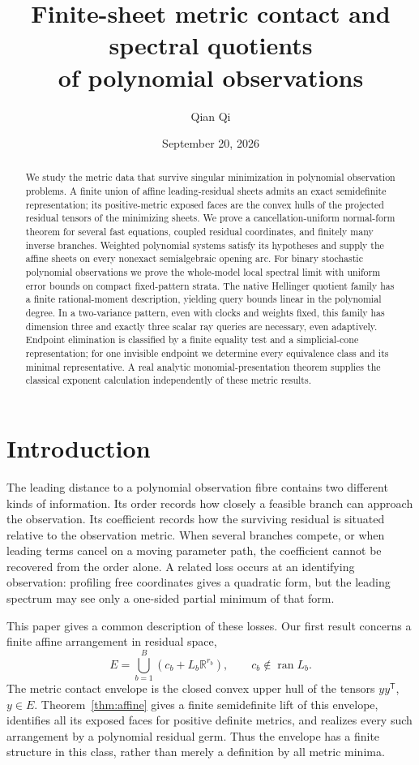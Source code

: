 \documentclass[11pt,reqno]{amsart}
\title[Finite-sheet metric contact]{Finite-sheet metric contact and spectral quotients\\ of polynomial observations}
\author{Qian Qi}
\date{September 20, 2026}
\numberwithin{equation}{section}
\theoremstyle{definition}
\theoremstyle{remark}
\newcommand{\R}{\mathbb R}
\newcommand{\ran}{\operatorname{ran}}
\begin{document}
\begin{abstract}
We study the metric data that survive singular minimization in polynomial observation problems. A finite union of affine leading-residual sheets admits an exact semidefinite representation; its positive-metric exposed faces are the convex hulls of the projected residual tensors of the minimizing sheets. We prove a cancellation-uniform normal-form theorem for several fast equations, coupled residual coordinates, and finitely many inverse branches. Weighted polynomial systems satisfy its hypotheses and supply the affine sheets on every nonexact semialgebraic opening arc. For binary stochastic polynomial observations we prove the whole-model local spectral limit with uniform error bounds on compact fixed-pattern strata. The native Hellinger quotient family has a finite rational-moment description, yielding query bounds linear in the polynomial degree. In a two-variance pattern, even with clocks and weights fixed, this family has dimension three and exactly three scalar ray queries are necessary, even adaptively. Endpoint elimination is classified by a finite equality test and a simplicial-cone representation; for one invisible endpoint we determine every equivalence class and its minimal representative. A real analytic monomial-presentation theorem supplies the classical exponent calculation independently of these metric results.
\end{abstract}
\maketitle

\section{Introduction}
The leading distance to a polynomial observation fibre contains two different kinds of information. Its order records how closely a feasible branch can approach the observation. Its coefficient records how the surviving residual is situated relative to the observation metric. When several branches compete, or when leading terms cancel on a moving parameter path, the coefficient cannot be recovered from the order alone. A related loss occurs at an identifying observation: profiling free coordinates gives a quadratic form, but the leading spectrum may see only a one-sided partial minimum of that form.

This paper gives a common description of these losses. Our first result concerns a finite affine arrangement in residual space,
\begin{equation}\label{eq:intro-sheets}
 E=\bigcup_{b=1}^B(c_b+L_b\R^{r_b}),\qquad c_b\notin\ran L_b.
\end{equation}
The metric contact envelope is the closed convex upper hull of the tensors $yy^{\mathsf T}$, $y\in E$. Theorem~\ref{thm:affine} gives a finite semidefinite lift of this envelope, identifies all its exposed faces for positive definite metrics, and realizes every such arrangement by a polynomial residual germ. Thus the envelope has a finite structure in this class, rather than merely a definition by all metric minima.
\end{document}
